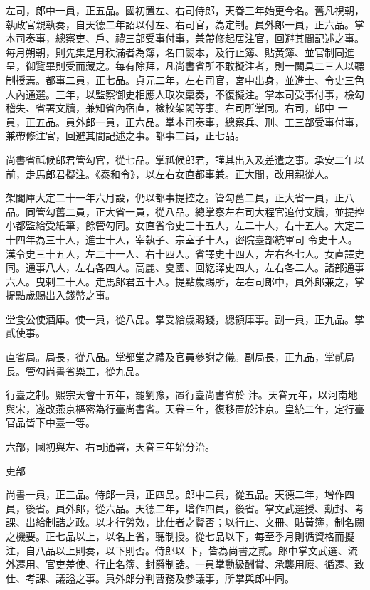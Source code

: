 \begin{pinyinscope}
 左司，郎中一員，正五品。國初置左、右司侍郎，天眷三年始更今名。舊凡視朝，執政官親執奏，自天德二年詔以付左、右司官，為定制。員外郎一員，正六品。掌本司奏事，總察吏、戶、禮三部受事付事，兼帶修起居注官，回避其間記述之事。每月朔朝，則先集是月秩滿者為簿，名曰闕本，及行止簿、貼黃簿、並官制同進呈，御覽畢則受而藏之。每有除拜，凡尚書省所不敢擬注者，則一闕具二三人以聽制授焉。都事二員，正七品。貞元二年，左右司官，宮中出身，並進士、令史三色人內通選。三年，以監察御史相應人取次稟奏，不復擬注。掌本司受事付事，檢勾稽失、省署文牘，兼知省內宿直，檢校架閣等事。右司所掌同。右司，郎中
 一員，正五品。員外郎一員，正六品。掌本司奏事，總察兵、刑、工三部受事付事，兼帶修注官，回避其間記述之事。都事二員，正七品。



 尚書省祗候郎君管勾官，從七品。掌祗候郎君，謹其出入及差遣之事。承安二年以前，走馬郎君擬注。《泰和令》，以左右女直都事兼。正大間，改用親從人。



 架閣庫大定二十一年六月設，仍以都事提控之。管勾舊二員，正大省一員，正八品。同管勾舊二員，正大省一員，從八品。總掌察左右司大程官追付文牘，並提控小都監給受紙筆，餘管勾同。女直省令史三十五人，左二十人，右十五人。大定二十四年為三十人，進士十人，宰執子、宗室子十人，密院臺部統軍司
 令史十人。漢令史三十五人，左二十一人、右十四人。省譯史十四人，左右各七人。女直譯史同。通事八人，左右各四人。高麗、夏國、回紇譯史四人，左右各二人。諸部通事六人。曳剌二十人。走馬郎君五十人。提點歲賜所，左右司郎中，員外郎兼之，掌提點歲賜出入錢幣之事。



 堂食公使酒庫。使一員，從八品。掌受給歲賜錢，總領庫事。副一員，正九品。掌貳使事。



 直省局。局長，從八品。掌都堂之禮及官員參謝之儀。副局長，正九品，掌貳局長。管勾尚書省樂工，從九品。



 行臺之制。熙宗天會十五年，罷劉豫，置行臺尚書省於
 汴。天眷元年，以河南地與宋，遂改燕京樞密為行臺尚書省。天眷三年，復移置於汴京。皇統二年，定行臺官品皆下中臺一等。



 六部，國初與左、右司通署，天眷三年始分治。



 吏部



 尚書一員，正三品。侍郎一員，正四品。郎中二員，從五品。天德二年，增作四員，後省。員外郎，從六品。天德二年，增作四員，後省。掌文武選授、勳封、考課、出給制誥之政。以才行勞效，比仕者之賢否；以行止、文冊、貼黃簿，制名闕之機要。正七品以上，以名上省，聽制授。從七品以下，每至季月則循資格而擬注，自八品以上則奏，以下則否。侍郎以
 下，皆為尚書之貳。郎中掌文武選、流外遷用、官吏差使、行止名簿、封爵制誥。一員掌勳級酬賞、承襲用廕、循遷、致仕、考課、議謚之事。員外郎分判曹務及參議事，所掌與郎中同。




\end{pinyinscope}
